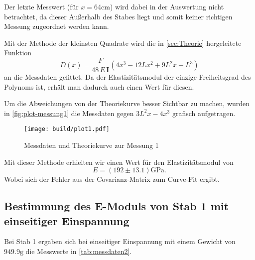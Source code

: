 Der letzte Messwert (für $x = 64\si{\centi\meter}$) wird dabei in der Auswertung nicht
betrachtet, da dieser Außerhalb des Stabes liegt und somit keiner richtigen Messung 
zugeordnet werden kann.

Mit der Methode der kleinsten Quadrate wird die in \autoref{sec:Theorie} hergeleitete
Funktion 
\begin{equation}
	D(x) = \frac{F}{48 \, E \, \mathbf{I}} \left(4x^3 - 12Lx^2 + 9L^2x - L^3 \right)
\end{equation}
an die Messdaten gefittet. Da der Elastizitätsmodul der einzige
Freiheitsgrad des Polynoms ist, erhält man dadurch auch einen Wert für diesen.

Um die Abweichungen von der Theoriekurve besser Sichtbar zu machen, 
wurden in \autoref{fig:plot-messung1} die Messdaten gegen $3L^2x - 4x^3$ grafisch 
aufgetragen.
\begin{figure}[H]
	\centering
	\texttt{[image: build/plot1.pdf]}
	\caption{Messdaten und Theoriekurve zur Messung 1}
	\label{fig:plot-messung1}
\end{figure}

Mit dieser Methode erhielten wir einen Wert für den Elastizitätsmodul von
\begin{equation}
	E = (192 \pm 13.1) \si{\giga\pascal}.
	\label{eqn:E-messung1}
\end{equation}
Wobei sich der Fehler aus der Covarianz-Matrix zum Curve-Fit ergibt.

\subsection{Bestimmung des E-Moduls von Stab 1 mit einseitiger Einspannung}
\label{sec:messung2}

Bei Stab 1 ergaben sich bei einseitiger Einspannung 
mit einem Gewicht von $949.9 \si{\gram}$ 
die Messwerte in \autoref{tab:messdaten2}.

